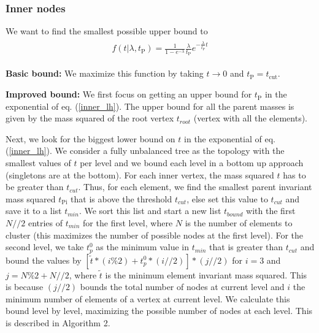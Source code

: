 \documentclass[12pt]{article}
\newcommand{\bea}{\begin{eqnarray}\begin{aligned}}
\newcommand{\eea}{\end{aligned}\end{eqnarray}}
\begin{document}
\subsubsection{ Inner nodes}
We want to find the smallest possible upper bound to 
\bea\label{inner_lh}
 f(t | \lambda, t_{\text{P}})=\frac{1}{1-e^{- \lambda}} \frac{\lambda}{t_{\text{P}}} e^{- \frac{\lambda}{ t_{\text{P}}} t} 
\eea

{\bf Basic bound:} We maximize this function by taking $t \rightarrow 0$ and $t_{\text{P}} = t_{\text{cut}}$.

{\bf Improved bound:}
We first focus on getting an upper bound for $ t_{\text{P}}$ in the exponential of eq. (\ref{inner_lh}). The upper bound for all the parent masses is given by the mass squared of the root vertex $t_{root}$ (vertex with all the elements). 

Next, we look for the biggest lower bound on $t$ in the exponential of eq. (\ref{inner_lh}).
We consider a fully unbalanced tree as the topology with the smallest values of $t$ per level and we bound each level in a bottom up approach (singletons are at the bottom).  For each inner vertex, the mass squared $t$ has to be greater than $t_{cut}$. Thus, for each element, we find the smallest parent invariant mass squared $t_{\text{Pi}}$ that is above the threshold $t_{cut}$, else set this value to $t_{cut}$ and save it to a list $t_{min}$. We sort this list and start a new list $t_{bound}$ with the first  $N//2$ entries of $t_{min}$ for the first level, where $N$ is the number of elements to cluster (this maximizes the number of possible nodes at the first level).
For the second level, we take $t_p^0$ as the minimum value in $t_{min}$ that is greater than $t_{cut}$ and bound the values by 
$[\tilde{t} *(i\%2)+ t_p^0*(i//2)] * (j// 2)$ for  $i = 3$ and $j = N \% 2 + N // 2$, where $\tilde{t}$ is the minimum element invariant mass squared. This is because $(j// 2)$ bounds the total number of nodes at current level and $i$ the minimum number of elements of a vertex at current level.
We calculate this bound level by level, maximizing the possible number of nodes at each level. This is described in Algorithm 2.
\end{document}
